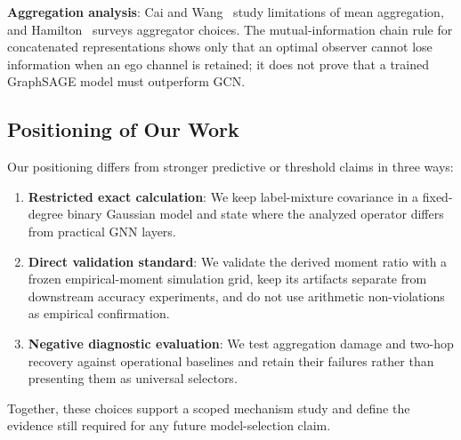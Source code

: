 \textbf{Aggregation analysis}: Cai and Wang~\cite{cai2020note} study limitations of mean aggregation, and Hamilton~\cite{hamilton2020book} surveys aggregator choices. The mutual-information chain rule for concatenated representations shows only that an optimal observer cannot lose information when an ego channel is retained; it does not prove that a trained GraphSAGE model must outperform GCN.

\subsection{Positioning of Our Work}

Our positioning differs from stronger predictive or threshold claims in three ways:

\begin{enumerate}
    \item \textbf{Restricted exact calculation}: We keep label-mixture covariance in a fixed-degree binary Gaussian model and state where the analyzed operator differs from practical GNN layers.

    \item \textbf{Direct validation standard}: We validate the derived moment ratio with a frozen empirical-moment simulation grid, keep its artifacts separate from downstream accuracy experiments, and do not use arithmetic non-violations as empirical confirmation.

    \item \textbf{Negative diagnostic evaluation}: We test aggregation damage and two-hop recovery against operational baselines and retain their failures rather than presenting them as universal selectors.
\end{enumerate}

Together, these choices support a scoped mechanism study and define the evidence still required for any future model-selection claim.
